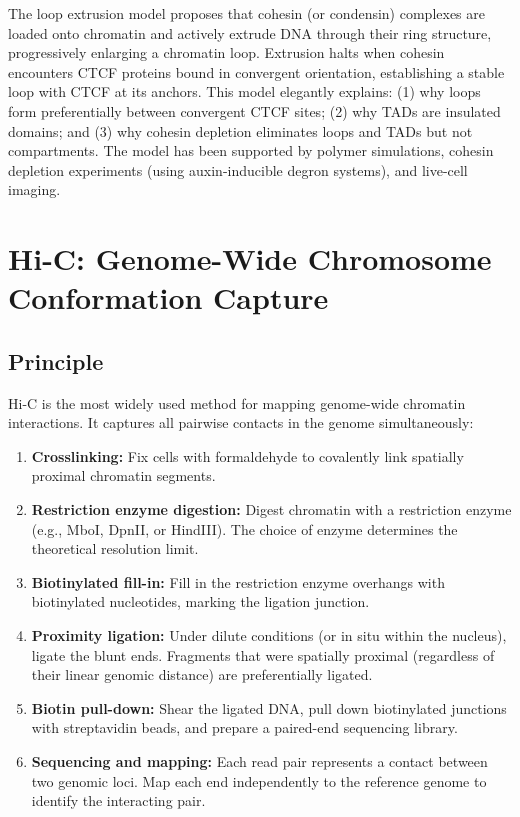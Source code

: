 \begin{keyconcept}[title={The Loop Extrusion Model}]
The loop extrusion model proposes that cohesin (or condensin) complexes are loaded onto chromatin and actively extrude DNA through their ring structure, progressively enlarging a chromatin loop. Extrusion halts when cohesin encounters CTCF proteins bound in convergent orientation, establishing a stable loop with CTCF at its anchors. This model elegantly explains: (1) why loops form preferentially between convergent CTCF sites; (2) why TADs are insulated domains; and (3) why cohesin depletion eliminates loops and TADs but not compartments. The model has been supported by polymer simulations, cohesin depletion experiments (using auxin-inducible degron systems), and live-cell imaging.
\end{keyconcept}

\section{Hi-C: Genome-Wide Chromosome Conformation Capture}
\label{sec:3dgenome:hic}

\subsection{Principle}
\label{subsec:3dgenome:hic-principle}

Hi-C is the most widely used method for mapping genome-wide chromatin interactions. It captures all pairwise contacts in the genome simultaneously:

\begin{enumerate}[itemsep=2pt]
  \item \textbf{Crosslinking:} Fix cells with formaldehyde to covalently link spatially proximal chromatin segments.
  \item \textbf{Restriction enzyme digestion:} Digest chromatin with a restriction enzyme (e.g., MboI, DpnII, or HindIII). The choice of enzyme determines the theoretical resolution limit.
  \item \textbf{Biotinylated fill-in:} Fill in the restriction enzyme overhangs with biotinylated nucleotides, marking the ligation junction.
  \item \textbf{Proximity ligation:} Under dilute conditions (or in situ within the nucleus), ligate the blunt ends. Fragments that were spatially proximal (regardless of their linear genomic distance) are preferentially ligated.
  \item \textbf{Biotin pull-down:} Shear the ligated DNA, pull down biotinylated junctions with streptavidin beads, and prepare a paired-end sequencing library.
  \item \textbf{Sequencing and mapping:} Each read pair represents a contact between two genomic loci. Map each end independently to the reference genome to identify the interacting pair.
\end{enumerate}

